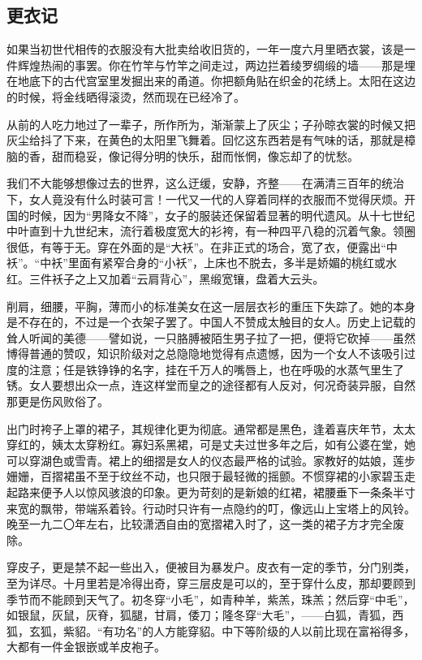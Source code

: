 \subsection{更衣记}


\par 如果当初世代相传的衣服没有大批卖给收旧货的，一年一度六月里晒衣裳，该是一件辉煌热闹的事罢。你在竹竿与竹竿之间走过，两边拦着绫罗绸缎的墙——那是埋在地底下的古代宫室里发掘出来的甬道。你把额角贴在织金的花绣上。太阳在这边的时候，将金线晒得滚烫，然而现在已经冷了。
\par 从前的人吃力地过了一辈子，所作所为，渐渐蒙上了灰尘；子孙晾衣裳的时候又把灰尘给抖了下来，在黄色的太阳里飞舞着。回忆这东西若是有气味的话，那就是樟脑的香，甜而稳妥，像记得分明的快乐，甜而怅惘，像忘却了的忧愁。
\par 我们不大能够想像过去的世界，这么迂缓，安静，齐整——在满清三百年的统治下，女人竟没有什么时装可言！一代又一代的人穿着同样的衣服而不觉得厌烦。开国的时候，因为“男降女不降”，女子的服装还保留着显著的明代遗风。从十七世纪中叶直到十九世纪末，流行着极度宽大的衫袴，有一种四平八稳的沉着气象。领圈很低，有等于无。穿在外面的是“大袄”。在非正式的场合，宽了衣，便露出“中袄”。“中袄”里面有紧窄合身的“小袄”，上床也不脱去，多半是娇媚的桃红或水红。三件袄子之上又加着“云肩背心”，黑缎宽镶，盘着大云头。
\par 削肩，细腰，平胸，薄而小的标准美女在这一层层衣衫的重压下失踪了。她的本身是不存在的，不过是一个衣架子罢了。中国人不赞成太触目的女人。历史上记载的耸人听闻的美德——譬如说，一只胳膊被陌生男子拉了一把，便将它砍掉——虽然博得普通的赞叹，知识阶级对之总隐隐地觉得有点遗憾，因为一个女人不该吸引过度的注意；任是铁铮铮的名字，挂在千万人的嘴唇上，也在呼吸的水蒸气里生了锈。女人要想出众一点，连这样堂而皇之的途径都有人反对，何况奇装异服，自然那更是伤风败俗了。
\par 出门时袴子上罩的裙子，其规律化更为彻底。通常都是黑色，逢着喜庆年节，太太穿红的，姨太太穿粉红。寡妇系黑裙，可是丈夫过世多年之后，如有公婆在堂，她可以穿湖色或雪青。裙上的细摺是女人的仪态最严格的试验。家教好的姑娘，莲步姗姗，百摺裙虽不至于纹丝不动，也只限于最轻微的摇颤。不惯穿裙的小家碧玉走起路来便予人以惊风骇浪的印象。更为苛刻的是新娘的红裙，裙腰垂下一条条半寸来宽的飘带，带端系着铃。行动时只许有一点隐约的叮，像远山上宝塔上的风铃。晚至一九二〇年左右，比较潇洒自由的宽摺裙入时了，这一类的裙子方才完全废除。
\par 穿皮子，更是禁不起一些出入，便被目为暴发户。皮衣有一定的季节，分门别类，至为详尽。十月里若是冷得出奇，穿三层皮是可以的，至于穿什么皮，那却要顾到季节而不能顾到天气了。初冬穿“小毛”，如青种羊，紫羔，珠羔；然后穿“中毛”，如银鼠，灰鼠，灰脊，狐腿，甘肩，倭刀；隆冬穿“大毛”，——白狐，青狐，西狐，玄狐，紫貂。“有功名”的人方能穿貂。中下等阶级的人以前比现在富裕得多，大都有一件金银嵌或羊皮袍子。
